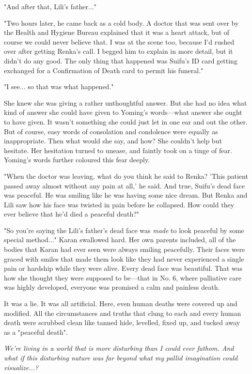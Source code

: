 "And after that, Lili's father..."

"Two hours later, he came back as a cold body. A doctor that was sent
over by the Health and Hygiene Bureau explained that it was a heart
attack, but of course we could never believe that. I was at the scene
too, because I'd rushed over after getting Renka's call. I begged him to
explain in more detail, but it didn't do any good. The only thing that
happened was Suifu's ID card getting exchanged for a Confirmation of
Death card to permit his funeral."

"I see... so that was what happened."

She knew she was giving a rather unthoughtful answer. But she had no
idea what kind of answer she could have given to Yoming's words---what
answer she ought to have given. It wasn't something she could just let
in one ear and out the other. But of course, easy words of consolation
and condolence were equally as inappropriate. Then what would she say,
and how? She couldn't help but hesitate. Her hesitation turned to
unease, and faintly took on a tinge of fear. Yoming's words further
coloured this fear deeply.

"When the doctor was leaving, what do you think he said to Renka? 'This
patient passed away almost without any pain at all,' he said. And true,
Suifu's dead face was peaceful. He was smiling like he was having some
nice dream. But Renka and Lili saw how his face was twisted in pain
before he collapsed. How could they ever believe that he'd died a
peaceful death?"

"So you're saying the Lili's father's dead face was \emph{made} to look
peaceful by some special method..." Karan swallowed hard. Her own
parents included, all of the bodies that Karan had ever seen were always
smiling peacefully. Their faces were graced with smiles that made them
look like they had never experienced a single pain or hardship while
they were alive. Every dead face was beautiful. That was how she thought
they were supposed to be---that in No. 6, where palliative care was highly
developed, everyone was promised a calm and painless death.

It was a lie. It was all artificial. Here, even human deaths were
covered up and modified. All the circumstances and truths that clung to
each and every human death were scrubbed clean like tanned hide,
levelled, fixed up, and tucked away as a "peaceful death".

\emph{We're living in a world that is more disturbing than I could ever
fathom. And what if this disturbing nature was far beyond what my pallid
imagination could visualize...?}

